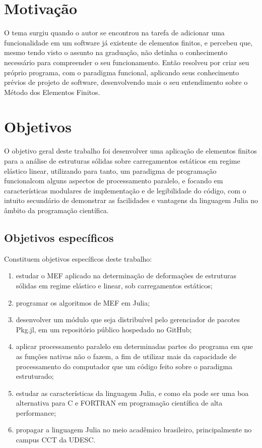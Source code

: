 \section{Motivação}

O tema surgiu quando o autor se encontrou na tarefa de adicionar uma funcionalidade em um software já existente de elementos finitos, e percebeu que, mesmo tendo visto o assunto na graduação, não detinha o conhecimento necessário para compreender o seu funcionamento. Então resolveu por criar seu próprio programa, com o paradigma funcional, aplicando seus conhecimento prévios de projeto de software, desenvolvendo mais o seu entendimento sobre o Método dos Elementos Finitos.


\section{Objetivos}

O objetivo geral deste trabalho foi desenvolver uma aplicação de elementos finitos para a análise de estruturas sólidas sobre carregamentos estáticos em regime elástico linear, utilizando para tanto, um paradigma de programação funcional\footnotemark[1] com alguns aspectos de processamento paralelo, e focando em características modulares de implementação e de legibilidade do código, com o intuito secundário de demonstrar as facilidades e vantagens da linguagem Julia no âmbito da programação científica.


\subsection{Objetivos específicos}

Constituem objetivos específicos deste trabalho:

\begin{enumerate}
    \item estudar o MEF aplicado na determinação de deformações de estruturas sólidas em regime elástico e linear, sob carregamentos estáticos;
    \item programar os algoritmos de MEF em Julia;
    \item desenvolver um módulo que seja distribuível pelo gerenciador de pacotes Pkg.jl, em um repositório público hospedado no GitHub;
    \item aplicar processamento paralelo em determinadas partes do programa em que as funções nativas não o fazem, a fim de utilizar mais da capacidade de processamento do computador que um código feito sobre o paradigma estruturado;
    \item estudar as características da linguagem Julia, e como ela pode ser uma boa alternativa para C e FORTRAN em programação científica de alta performance;
    \item propagar a linguagem Julia no meio acadêmico brasileiro, principalmente no campus CCT da UDESC.
\end{enumerate}

